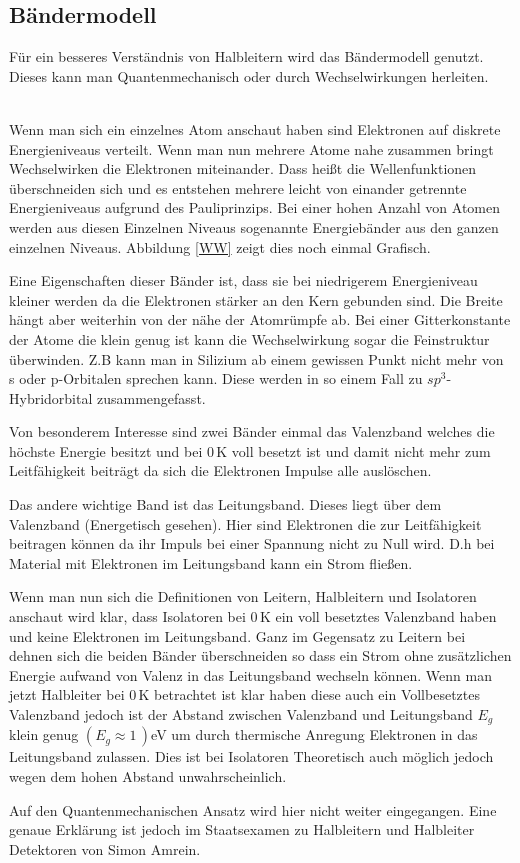 \subsection{Bändermodell}
Für ein besseres Verständnis von Halbleitern wird das Bändermodell genutzt. Dieses kann man Quantenmechanisch oder durch Wechselwirkungen herleiten.\par 
\ \\
Wenn man sich ein einzelnes Atom anschaut haben sind Elektronen auf diskrete  Energieniveaus verteilt. Wenn man nun mehrere Atome nahe zusammen bringt Wechselwirken die Elektronen miteinander. Dass heißt die Wellenfunktionen überschneiden sich und es entstehen mehrere leicht von einander getrennte Energieniveaus aufgrund des Pauliprinzips. Bei einer hohen Anzahl von Atomen werden aus diesen Einzelnen Niveaus sogenannte Energiebänder aus den ganzen einzelnen Niveaus.
Abbildung \ref{WW} zeigt dies noch einmal Grafisch.\par
Eine Eigenschaften dieser Bänder ist, dass sie bei niedrigerem Energieniveau kleiner werden da die Elektronen stärker an den Kern gebunden sind. Die Breite hängt aber weiterhin von der nähe der Atomrümpfe ab. Bei einer Gitterkonstante der Atome die klein genug ist kann die Wechselwirkung sogar die Feinstruktur überwinden. Z.B kann man in Silizium ab einem gewissen Punkt nicht mehr von s oder p-Orbitalen sprechen kann. Diese werden in so einem Fall zu $sp^3$-Hybridorbital zusammengefasst.\par
Von besonderem Interesse sind zwei Bänder einmal das Valenzband welches die höchste Energie besitzt und bei $0$\,K voll besetzt ist und damit nicht mehr zum Leitfähigkeit beiträgt da sich die Elektronen Impulse alle auslöschen.\par
Das andere wichtige Band ist das Leitungsband. Dieses liegt über dem Valenzband (Energetisch gesehen). Hier sind Elektronen die zur Leitfähigkeit beitragen können da ihr Impuls bei einer Spannung nicht zu Null wird. D.h bei Material mit Elektronen im Leitungsband kann ein Strom fließen.\par
Wenn man nun sich die Definitionen von Leitern, Halbleitern und Isolatoren anschaut wird klar, dass Isolatoren bei $0\,$K ein voll besetztes Valenzband haben und keine Elektronen im Leitungsband. Ganz im Gegensatz zu Leitern bei dehnen sich die beiden Bänder überschneiden so dass ein Strom ohne zusätzlichen Energie aufwand von Valenz in das Leitungsband wechseln können. Wenn man jetzt Halbleiter bei $0$\,K betrachtet ist klar haben diese auch ein Vollbesetztes Valenzband jedoch ist der Abstand zwischen Valenzband und Leitungsband $E_g$ klein genug $(E_g\approx1\,)$eV um durch thermische Anregung Elektronen in das Leitungsband zulassen. Dies ist bei Isolatoren Theoretisch auch möglich jedoch wegen dem hohen Abstand unwahrscheinlich.\par
Auf den Quantenmechanischen Ansatz wird hier nicht weiter eingegangen. Eine genaue Erklärung ist jedoch im Staatsexamen zu Halbleitern und Halbleiter Detektoren von Simon Amrein.  \cite{Staatsexamen}\\
